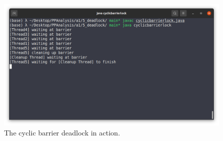 \documentclass{article}
\begin{document}
      

      \begin{figure}[ht]
        \centering
        \includegraphics[scale=0.4]{5_deadlock/cyclic_barrier_deadlock.png}
        \caption{The cyclic barrier deadlock in action. }
        \label{fig::52}
      \end{figure}
\end{document}
